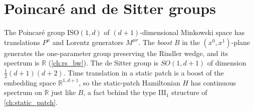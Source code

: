 \section{Poincar\'e and de Sitter groups}
The Poincar\'e group $\mathrm{ISO}(1,d)$ of $(d{+}1)$-dimensional Minkowski space has translations $P^\mu$ and Lorentz generators $M^{\mu\nu}$. The \emph{boost} $B$ in the $(x^0,x^1)$-plane generates the one-parameter group preserving the Rindler wedge, and its spectrum is $\mathbb R$ (\cref{ch:rs_bw}). The de Sitter group is $SO(1,d+1)$ of dimension $\tfrac12(d+1)(d+2)$. Time translation in a static patch is a boost of the embedding space $\mathbb R^{1,d+1}$, so the static-patch Hamiltonian $H$ has continuous spectrum on $\mathbb R$ just like $B$, a fact behind the type III$_1$ structure of \cref{ch:static_patch}.

